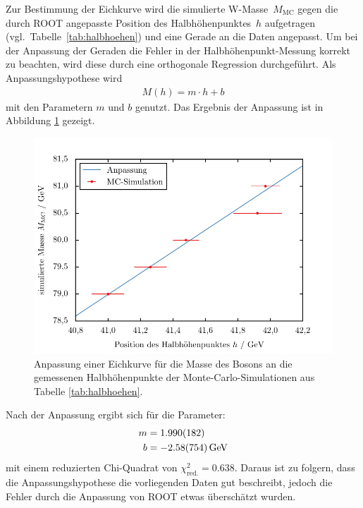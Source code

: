 \documentclass[11pt, a4paper]{article}
\numberwithin{equation}{section}
\begin{document}
Zur Bestimmung der Eichkurve wird die simulierte W-Masse~$M_\mathrm{MC}$ gegen die durch ROOT angepasste Position des Halbhöhenpunktes~$h$ aufgetragen (vgl.\ Tabelle~\ref{tab:halbhoehen}) und eine Gerade an die Daten angepasst.
Um bei der Anpassung der Geraden die Fehler in der Halbhöhenpunkt-Messung korrekt zu beachten, wird diese durch eine orthogonale Regression \cite{odr} durchgeführt.
Als Anpassungshypothese wird
\begin{align*}
	M(h) = m \cdot h + b
\end{align*}
mit den Parametern $m$ und $b$ genutzt.
Das Ergebnis der Anpassung ist in Abbildung \ref{fig:gauge_curve} gezeigt.
\begin{figure}[h]
	\centering
	\includegraphics{./figures/wmass/gauge.pdf}
	\caption{Anpassung einer Eichkurve für die Masse des Bosons an die gemessenen Halbhöhenpunkte der Monte-Carlo-Simulationen aus Tabelle \ref{tab:halbhoehen}.}
	\label{fig:gauge_curve}
\end{figure}

\noindent Nach der Anpassung ergibt sich für die Parameter:
\begin{align*}
	m &= \num{1.990 +- 0.182} \\
	b &= \SI{-2.58 +- 7.54}{\GeV}
\end{align*}
mit einem reduzierten Chi-Quadrat von $\chi_\mathrm{red.}^2 = \num{0.638}$.
Daraus ist zu folgern, dass die Anpassungshypothese die vorliegenden Daten gut beschreibt, jedoch die Fehler durch die Anpassung von ROOT etwas überschätzt wurden.
\end{document}
